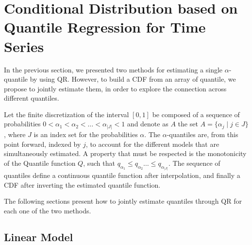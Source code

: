 \chapter{Conditional Distribution based on Quantile Regression for Time Series}

In the previous section, we presented two methods for estimating a single $\alpha$-quantile by using QR. However, to build a CDF from an array of quantile, we propose to jointly estimate them, in order to explore the connection across different quantiles. 

Let the finite discretization of the interval $[0,1]$ be composed of a sequence of probabilities $0 < \alpha_1 < \alpha_2 < \dots < \alpha_{|J|} < 1$ and denote as $A$ the set $A = \{ \alpha_j \mid j \in J \}$, where $J$ is an index set for the probabilities $\alpha$. 
The $\alpha$-quantiles are, from this point forward, indexed by $j$, to account for the different models that are simultaneously estimated. A property that must be respected is the monotonicity of the Quantile function $Q$, such that $q_{\alpha_1} \leq q_{\alpha_2} \dots \leq q_{\alpha_{|J|}}$.
The sequence of quantiles define a continuous quantile function after interpolation, and finally a CDF after inverting the estimated quantile function.

The following sections present how to jointly estimate quantiles through QR for each one of the two methods.



\section{Linear Model}


